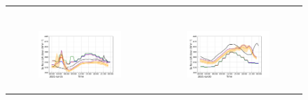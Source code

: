\begin{figure}[hbtp]
\begin{tabular}{cc}
\begin{subfigure}[t]{0.5\textwidth}
        \end{subfigure} \\
        \begin{subfigure}[t]{0.5\textwidth}
            \caption{}
            \includegraphics[width=\textwidth]{images/chap5/IOP_TS/TS_2021-07-15_elsplans_LWdnSFC.png}
        \end{subfigure} &
        \begin{subfigure}[t]{0.5\textwidth}
            \caption{}
            \includegraphics[width=\textwidth]{images/chap5/IOP_TS/TS_2021-07-20_elsplans_LWdnSFC.png}
        \end{subfigure} 
    \end{tabular}
    \caption{}
    \label{fig:iop_days_TS_energy_elsplans}
\end{figure}


